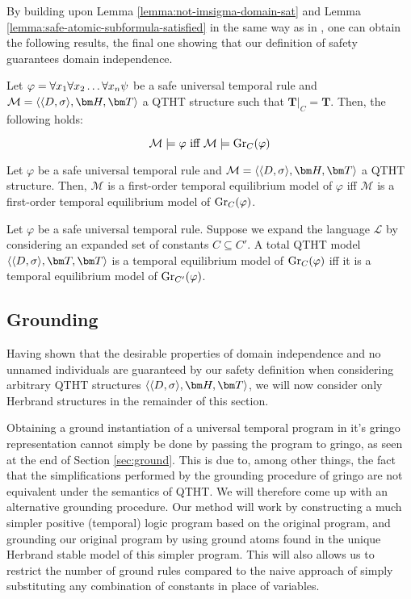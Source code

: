 By building upon Lemma \ref{lemma:not-imsigma-domain-sat} and Lemma
\ref{lemma:safe-atomic-subformula-satisfied} in the same way as in
\cite{agcapevidi17a}, one can obtain the following results, the final
one showing that our definition of safety guarantees domain independence.

\begin{proposition}\label{prop:sat-iff-sat-groundc}
  Let $\varphi = \forall x_1 \forall x_2 \dots \forall x_n \psi$ be a safe universal temporal rule and \\
  $\mathcal{M} = \qthandt$ a QTHT structure such that
  $\bm{T}\vert_{C}=\bm{T}$. Then, the following holds:

  \begin{equation*}
    \mathcal{M} \models \varphi \text{ iff } \mathcal{M} \models \operatorname{Gr}_{C}(\varphi)
  \end{equation*}
\end{proposition}

\begin{proposition}\label{prop:equil-iff-equil-groundc}
  Let $\varphi$ be a safe universal temporal rule and
  $\mathcal{M} = \qthandt$ a QTHT structure. Then, $\mathcal{M}$ is a
  first-order temporal equilibrium model of $\varphi$ iff
  $\mathcal{M}$ is a first-order temporal equilibrium model of
  $\operatorname{Gr}_{C}(\varphi)$.
\end{proposition}

\begin{theorem}\label{theorem:domain-independence}
  Let $\varphi$ be a safe universal temporal rule. Suppose we expand
  the language $\mathcal{L}$ by considering an expanded set of
  constants $C \subseteq C'$. A total QTHT model $\qttandt$ is a
  temporal equilibrium model of $\operatorname{Gr}_{C}(\varphi)$ iff it is a
  temporal equilibrium model of $\operatorname{Gr}_{C'}(\varphi)$.
\end{theorem}

\subsection{Grounding}
Having shown that the desirable properties of domain independence and
no unnamed individuals are guaranteed by our safety definition when
considering arbitrary QTHT structures $\qthandt$, we will now consider
only Herbrand structures in the remainder of this section.

Obtaining a ground instantiation of a universal temporal program in
it's gringo representation cannot simply be done by passing the
program to gringo, as seen at the end of Section
\ref{sec:ground}. This is due to, among other things, the fact that
the simplifications performed by the grounding procedure of gringo are
not equivalent under the semantics of QTHT. We will therefore come up
with an alternative grounding procedure. Our method will work by
constructing a much simpler positive (temporal) logic program based on
the original program, and grounding our original program by using
ground atoms found in the unique Herbrand stable model of this simpler
program. This will also allows us to restrict the number of ground
rules compared to the naive approach of simply substituting any
combination of constants in place of variables.

